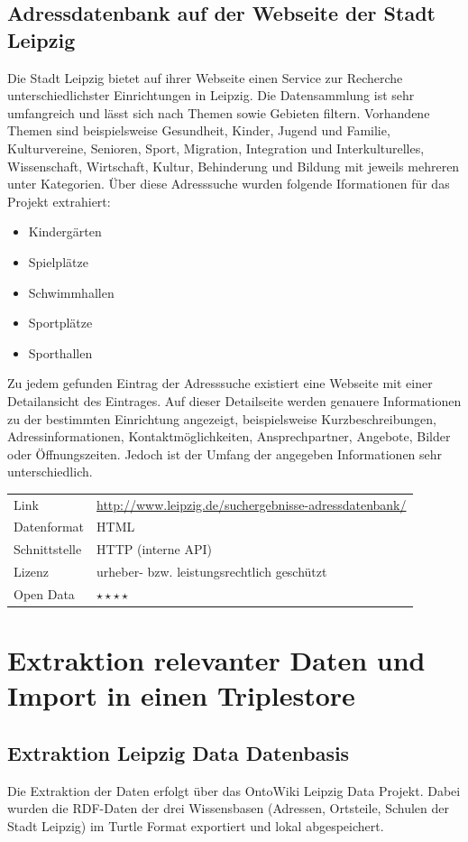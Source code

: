 \documentclass[parskip]{scrartcl}
\begin{document}
\subsection{Adressdatenbank auf der Webseite der Stadt Leipzig}
Die Stadt Leipzig bietet auf ihrer Webseite einen Service zur Recherche unterschiedlichster Einrichtungen in Leipzig. Die Datensammlung ist sehr umfangreich und lässt sich nach Themen sowie Gebieten filtern. Vorhandene Themen sind beispielsweise Gesundheit, Kinder, Jugend und Familie, Kulturvereine, Senioren, Sport, Migration, Integration und Interkulturelles, Wissenschaft, Wirtschaft, Kultur, Behinderung und Bildung mit jeweils mehreren unter Kategorien. Über diese Adresssuche wurden folgende Iformationen für das Projekt extrahiert:
\begin{itemize}
\setlength{\itemsep}{-5pt}
\item Kindergärten
\item Spielplätze
\item Schwimmhallen
\item Sportplätze
\item Sporthallen
\end{itemize}

Zu jedem gefunden Eintrag der Adresssuche existiert eine Webseite mit einer Detailansicht des Eintrages. Auf dieser Detailseite werden genauere Informationen zu der bestimmten Einrichtung angezeigt, beispielsweise Kurzbeschreibungen, Adressinformationen, Kontaktmöglichkeiten, Ansprechpartner, Angebote, Bilder oder Öffnungszeiten. Jedoch ist der Umfang der angegeben Informationen sehr unterschiedlich.

\begin{tabular}{l|p{9cm}}
	Link & \url{http://www.leipzig.de/suchergebnisse-adressdatenbank/} \\
 	Datenformat & HTML \\
 	Schnittstelle & HTTP (interne API) \\
 	Lizenz & urheber- bzw. leistungsrechtlich geschützt \\
 	Open Data & $\star\star\star\star$ \\
\end{tabular}


\section{Extraktion relevanter Daten und Import in einen Triplestore }


\subsection{Extraktion Leipzig Data Datenbasis}
Die Extraktion der Daten erfolgt über das OntoWiki Leipzig Data Projekt. Dabei wurden die RDF-Daten der drei Wissensbasen (Adressen, Ortsteile, Schulen der Stadt Leipzig) im Turtle Format exportiert und lokal abgespeichert.
\end{document}
